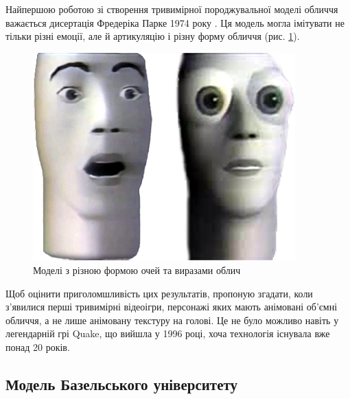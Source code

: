 Найпершою роботою зі створення
тривимірної породжувальної моделі обличчя важається
дисертація Фредеріка Парке 1974 року \cite{Parke:1974}.
Ця модель могла імітувати не тільки різні емоції,
але й артикуляцію і різну форму обличчя
(рис. \ref{fig:parke:face-models}).
\begin{figure}[h]
  \centering
    \includegraphics[width=0.9\textwidth]{images/Parke-faces}
  \caption{Моделі з різною формою очей та виразами облич}
  \label{fig:parke:face-models}
\end{figure}

Щоб оцінити приголомшливість цих результатів, пропоную згадати,
коли з'явилися перші тривимірні відеоігри,
персонажі яких мають анімовані об'ємні обличчя,
а не лише анімовану текстуру на голові.
Це не було можливо навіть у легендарній грі Quake,
що вийшла у 1996 році, хоча технологія існувала вже понад 20 років.

\subsection{Модель Базельського університету}


